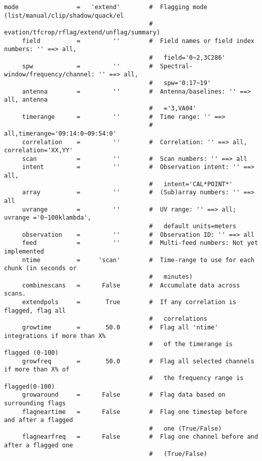 \small
\begin{verbatim}
mode                =   'extend'        #  Flagging mode (list/manual/clip/shadow/quack/el
                                        #   evation/tfcrop/rflag/extend/unflag/summary)
     field          =         ''        #  Field names or field index numbers: '' ==> all,
                                        #   field='0~2,3C286'
     spw            =         ''        #  Spectral-window/frequency/channel: '' ==> all,
                                        #   spw='0:17~19'
     antenna        =         ''        #  Antenna/baselines: '' ==> all, antenna
                                        #   ='3,VA04'
     timerange      =         ''        #  Time range: '' ==>
                                        #   all,timerange='09:14:0~09:54:0'
     correlation    =         ''        #  Correlation: '' ==> all, correlation='XX,YY'
     scan           =         ''        #  Scan numbers: '' ==> all
     intent         =         ''        #  Observation intent: '' ==> all,
                                        #   intent='CAL*POINT*'
     array          =         ''        #  (Sub)array numbers: '' ==> all
     uvrange        =         ''        #  UV range: '' ==> all; uvrange ='0~100klambda',
                                        #   default units=meters
     observation    =         ''        #  Observation ID: '' ==> all
     feed           =         ''        #  Multi-feed numbers: Not yet implemented
     ntime          =     'scan'        #  Time-range to use for each chunk (in seconds or
                                        #   minutes)
     combinescans   =      False        #  Accumulate data across scans.
     extendpols     =       True        #  If any correlation is flagged, flag all
                                        #   correlations
     growtime       =       50.0        #  Flag all 'ntime' integrations if more than X%
                                        #   of the timerange is flagged (0-100)
     growfreq       =       50.0        #  Flag all selected channels if more than X% of
                                        #   the frequency range is flagged(0-100)
     growaround     =      False        #  Flag data based on surrounding flags
     flagneartime   =      False        #  Flag one timestep before and after a flagged
                                        #   one (True/False)
     flagnearfreq   =      False        #  Flag one channel before and after a flagged one
                                        #   (True/False)
\end{verbatim}
\normalsize

